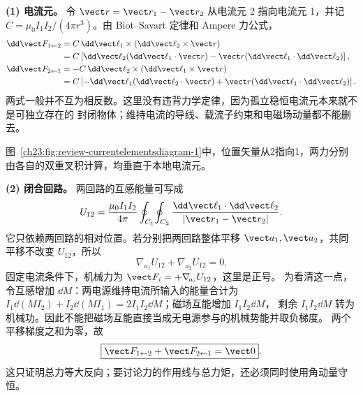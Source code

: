 \begin{xesolution}
\textbf{(1) 电流元。} 令 $\vect r=\vect r_1-\vect r_2$ 从电流元 2 指向电流元 1，并记
$C=\mu_0I_1I_2/(4\pi r^3)$。由 Biot--Savart 定律和 Ampere 力公式，
\begin{align}
  \dd\vect F_{1\leftarrow2}
  &=C\,\dd\vect\ell_1\times(\dd\vect\ell_2\times\vect r)\\
  &=C\left[\dd\vect\ell_2(\dd\vect\ell_1\cdot\vect r)
  -\vect r(\dd\vect\ell_1\cdot\dd\vect\ell_2)\right],\\
  \dd\vect F_{2\leftarrow1}
  &=-C\,\dd\vect\ell_2\times(\dd\vect\ell_1\times\vect r)\\
  &=C\left[-\dd\vect\ell_1(\dd\vect\ell_2\cdot\vect r)
  +\vect r(\dd\vect\ell_1\cdot\dd\vect\ell_2)\right].
\end{align}
两式一般并不互为相反数。这里没有违背力学定律，因为孤立稳恒电流元本来就不是可独立存在的
封闭物体；维持电流的导线、载流子约束和电磁场动量都不能删去。

图~\ref{ch23:fig:review-currentelementsdiagram-1}中，位置矢量从2指向1，两力分别由各自的双重叉积计算，均垂直于本地电流元。
\par\noindent\begin{minipage}{\linewidth}
\currentElementsDiagram
{}\label{ch23:fig:review-currentelementsdiagram-1}
\end{minipage}\par\medskip

\textbf{(2) 闭合回路。} 两回路的互感能量可写成
\begin{equation}
  U_{12}=\frac{\mu_0I_1I_2}{4\pi}
  \oint_{C_1}\!\oint_{C_2}
  \frac{\dd\vect\ell_1\cdot\dd\vect\ell_2}{|\vect r_1-\vect r_2|}.
\end{equation}
它只依赖两回路的相对位置。若分别把两回路整体平移 $\vect a_1,\vect a_2$，共同平移不改变
$U_{12}$，所以
\[
  \nabla_{\!a_1}U_{12}+\nabla_{\!a_2}U_{12}=0.
\]
固定电流条件下，机械力为 $\vect F_i=+\nabla_{\!a_i}U_{12}$，这里是正号。
为看清这一点，令互感增加 $\dd M$：两电源维持电流所输入的能量合计为
$I_1\dd(MI_2)+I_2\dd(MI_1)=2I_1I_2\dd M$；磁场互能增加 $I_1I_2\dd M$，
剩余 $I_1I_2\dd M$ 转为机械功。因此不能把磁场互能直接当成无电源参与的机械势能并取负梯度。
两个平移梯度之和为零，故
\begin{equation}
  \boxed{\vect F_{1\leftarrow2}+\vect F_{2\leftarrow1}=\vect0}.
\end{equation}
这只证明总力等大反向；要讨论力的作用线与总力矩，还必须同时使用角动量守恒。
\end{xesolution}


